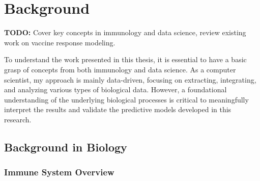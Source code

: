 \documentclass[12pt,a4paper]{report}
\newcommand{\todo}[1]{%
  \par\noindent%
  \begin{tcolorbox}[colback=yellow, colframe=black, boxrule=0.5pt, sharp corners, width=\linewidth, before skip=5pt, after skip=5pt]
    \textbf{TODO:} #1
  \end{tcolorbox}%
  \par
}
\begin{document}
\chapter{Background}
\todo{Cover key concepts in immunology and data science, review existing work on vaccine response modeling.}
\noindent
To understand the work presented in this thesis, it is essential to have a basic grasp of concepts from both immunology and data science. As a computer scientist, my approach is mainly data-driven, focusing on extracting, integrating, and analyzing various types of biological data. However, a foundational understanding of the underlying biological processes is critical to meaningfully interpret the results and validate the predictive models developed in this research.

\section{Background in Biology}

\subsection{Immune System Overview}
\end{document}
